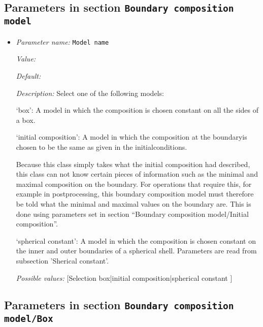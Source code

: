 \subsection{Parameters in section \tt Boundary composition model}
\label{parameters:Boundary_20composition_20model}

\begin{itemize}
\item {\it Parameter name:} {\tt Model name}


{\it Value:} 


{\it Default:} 


{\it Description:} Select one of the following models:

`box': A model in which the composition is chosen constant on all the sides of a box.

`initial composition': A model in which the composition at the boundaryis chosen to be the same as given in the initialconditions.

Because this class simply takes what the initial composition had described, this class can not know certain pieces of information such as the minimal and maximal composition on the boundary. For operations that require this, for example in postprocessing, this boundary composition model must therefore be told what the minimal and maximal values on the boundary are. This is done using parameters set in section ``Boundary composition model/Initial composition''.

`spherical constant': A model in which the composition is chosen constant on the inner and outer boundaries of a spherical shell. Parameters are read from subsection 'Sherical constant'.


{\it Possible values:} [Selection box|initial composition|spherical constant ]
\end{itemize}



\subsection{Parameters in section \tt Boundary composition model/Box}
\label{parameters:Boundary_20composition_20model/Box}

